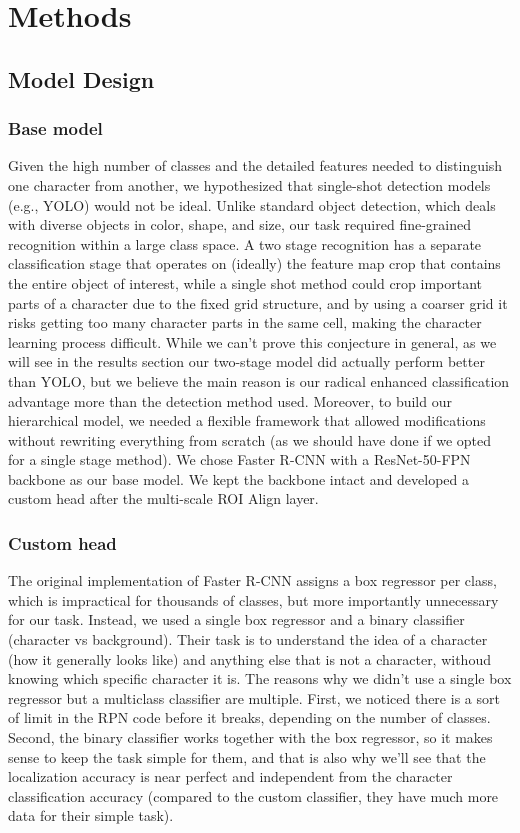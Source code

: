 \section{Methods}
\label{sec:methods}

\subsection{Model Design}
\label{sec:model}

\subsubsection{Base model}

Given the high number of classes and the detailed features needed to distinguish one character from another, we hypothesized that single-shot detection models (e.g., YOLO) would not be ideal. Unlike standard object detection, which deals with diverse objects in color, shape, and size, our task required fine-grained recognition within a large class space. A two stage recognition has a separate classification stage that operates on (ideally) the feature map crop that contains the entire object of interest, while a single shot method could crop important parts of a character due to the fixed grid structure, and by using a coarser grid it risks getting too many character parts in the same cell, making the character learning process difficult. While we can't prove this conjecture in general, as we will see in the results section our two-stage model did actually perform better than YOLO, but we believe the main reason is our radical enhanced classification advantage more than the detection method used.
Moreover, to build our hierarchical model, we needed a flexible framework that allowed modifications without rewriting everything from scratch (as we should have done if we opted for a single stage method). We chose Faster R-CNN with a ResNet-50-FPN backbone as our base model. We kept the backbone intact and developed a custom head after the multi-scale ROI Align layer.

\subsubsection{Custom head}

The original implementation of Faster R-CNN assigns a box regressor per class, which is impractical for thousands of classes, but more importantly unnecessary for our task. Instead, we used a single box regressor and a binary classifier (character vs background). Their task is to understand the idea of a character (how it generally looks like) and anything else that is not a character, withoud knowing which specific character it is. The reasons why we didn't use a single box regressor but a multiclass classifier are multiple. First, we noticed there is a sort of limit in the RPN code before it breaks, depending on the number of classes. Second, the binary classifier works together with the box regressor, so it makes sense to keep the task simple for them, and that is also why we'll see that the localization accuracy is near perfect and independent from the character classification accuracy (compared to the custom classifier, they have much more data for their simple task).

